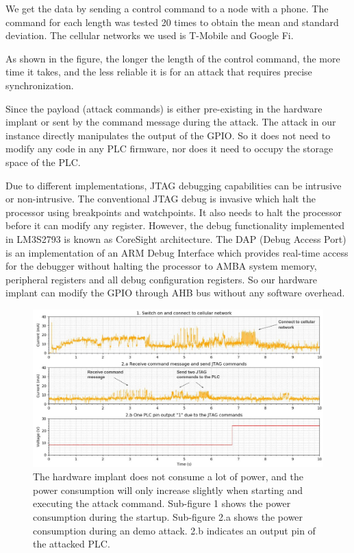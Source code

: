 We get the data by sending a control command to a node with a phone. The command for each length was tested 20 times to obtain the mean and standard deviation. The cellular networks we used is T-Mobile and Google Fi. 

As shown in the figure, the longer the length of the control command, the more time it takes, and the less reliable it is for an attack that requires precise synchronization.

Since the payload (attack commands) is either pre-existing in the hardware implant or sent by the command message during the attack. The attack in our instance directly manipulates the output of the GPIO. So it does not need to modify any code in any PLC firmware, nor does it need to occupy the storage space of the PLC.

Due to different implementations, JTAG debugging capabilities can be intrusive or non-intrusive. The conventional JTAG debug is invasive which halt the processor using breakpoints and watchpoints. It also needs to halt the processor before it can modify any register. However, the debug functionality implemented in LM3S2793 is known as CoreSight architecture. The DAP (Debug Access Port) is an implementation of an ARM Debug Interface which provides real-time access for the debugger without halting the processor to AMBA system memory, peripheral registers and all debug configuration registers. So our hardware implant can modify the GPIO through AHB bus without any software overhead.

\begin{figure}[h]
	\includegraphics[width=\textwidth]{figures/current}
	\centering
	\caption{The hardware implant does not consume a lot of power, and the power consumption will only increase slightly when starting and executing the attack command. Sub-figure 1 shows the power consumption during the startup. Sub-figure 2.a shows the power consumption during an demo attack. 2.b indicates an output pin of the attacked PLC. }
	\label{fig:current}
\end{figure}

